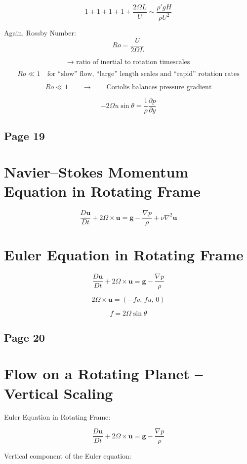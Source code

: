 \documentclass[11pt]{article}
\begin{document}
\[
    1+1+1+1+\frac{2\Omega L}{U}
    \sim
    \frac{\rho' g H}{\rho U^2}
\]

Again, Rossby Number:
\[
    Ro=\frac{U}{2\Omega L}
\]

\[
    \to \text{ ratio of inertial to rotation timescales}
\]

\[
    Ro \ll 1
    \quad
    \text{for ``slow'' flow, ``large'' length scales and ``rapid'' rotation rates}
\]

\[
    Ro \ll 1
    \qquad\to\qquad
    \text{Coriolis balances pressure gradient}
\]

\[
    -2\Omega u\sin\theta
    =
    \frac{1}{\rho}\frac{\partial p}{\partial y}
\]

\subsection*{Page 19}
\section*{Navier--Stokes Momentum Equation in Rotating Frame}

\[
    \frac{D\mathbf{u}}{Dt}
    +2\Omega\times\mathbf{u}
    =
    \mathbf{g}
    -\frac{\nabla p}{\rho}
    +\nu\nabla^2\mathbf{u}
\]

\section*{Euler Equation in Rotating Frame}

\[
    \frac{D\mathbf{u}}{Dt}
    +2\Omega\times\mathbf{u}
    =
    \mathbf{g}
    -\frac{\nabla p}{\rho}
\]

\[
    2\Omega\times\mathbf{u}
    =
    (-fv,\,fu,\,0)
\]

\[
    f=2\Omega\sin\theta
\]

\subsection*{Page 20}
\section*{Flow on a Rotating Planet -- Vertical Scaling}

Euler Equation in Rotating Frame:

\[
    \frac{D\mathbf{u}}{Dt}+2\Omega\times\mathbf{u}
    =
    \mathbf{g}-\frac{\nabla p}{\rho}
\]

Vertical component of the Euler equation:
\end{document}

